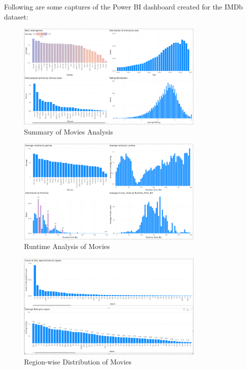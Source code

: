\documentclass[a4paper,12pt]{article}
\begin{document}
Following are some captures of the Power BI dashboard created for the IMDb dataset:

\begin{figure}[H]
    \centering
    \includegraphics[width=0.8\textwidth]{../assets/movies_summary.png}
    \caption{Summary of Movies Analysis}
    \label{fig:movies_summary}
\end{figure}

\begin{figure}[H]
    \centering
    \includegraphics[width=0.8\textwidth]{../assets/movies_runtime.png}
    \caption{Runtime Analysis of Movies}
    \label{fig:movies_runtime}
\end{figure}

\begin{figure}[H]
    \centering
    \includegraphics[width=0.8\textwidth]{../assets/movies_region.png}
    \caption{Region-wise Distribution of Movies}
    \label{fig:movies_region}
\end{figure}

\end{document}
